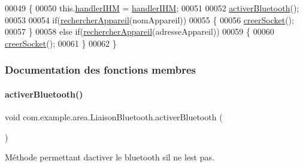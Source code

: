 \begin{DoxyCode}
00049     \{
00050         this.\hyperlink{classcom_1_1example_1_1area_1_1_liaison_bluetooth_ace2c20759fc96d3ae787f1f726fd2691}{handlerIHM} = \hyperlink{classcom_1_1example_1_1area_1_1_liaison_bluetooth_ace2c20759fc96d3ae787f1f726fd2691}{handlerIHM};
00051 
00052         \hyperlink{classcom_1_1example_1_1area_1_1_liaison_bluetooth_acc6b0431535ca4d7abc65e84deff8002}{activerBluetooth}();
00053 
00054         \textcolor{keywordflow}{if}(\hyperlink{classcom_1_1example_1_1area_1_1_liaison_bluetooth_a47786b43e054a81e08356cd22b4cb37e}{rechercherAppareil}(nomAppareil))
00055         \{
00056             \hyperlink{classcom_1_1example_1_1area_1_1_liaison_bluetooth_a69ea46dca5a0690d5d8231731ae60d9f}{creerSocket}();
00057         \}
00058         \textcolor{keywordflow}{else} \textcolor{keywordflow}{if}(\hyperlink{classcom_1_1example_1_1area_1_1_liaison_bluetooth_a47786b43e054a81e08356cd22b4cb37e}{rechercherAppareil}(adresseAppareil))
00059         \{
00060             \hyperlink{classcom_1_1example_1_1area_1_1_liaison_bluetooth_a69ea46dca5a0690d5d8231731ae60d9f}{creerSocket}();
00061         \}
00062     \}
\end{DoxyCode}


\subsubsection{Documentation des fonctions membres}
\mbox{\label{classcom_1_1example_1_1area_1_1_liaison_bluetooth_acc6b0431535ca4d7abc65e84deff8002}} 
\paragraph{\texorpdfstring{activer\+Bluetooth()}{activerBluetooth()}}
{\footnotesize\ttfamily void com.\+example.\+area.\+Liaison\+Bluetooth.\+activer\+Bluetooth (\begin{DoxyParamCaption}{ }\end{DoxyParamCaption})\hspace{0.3cm}{\ttfamily [private]}}



Méthode permettant d\textquotesingle{}activer le bluetooth s\textquotesingle{}il ne l\textquotesingle{}est pas. 



